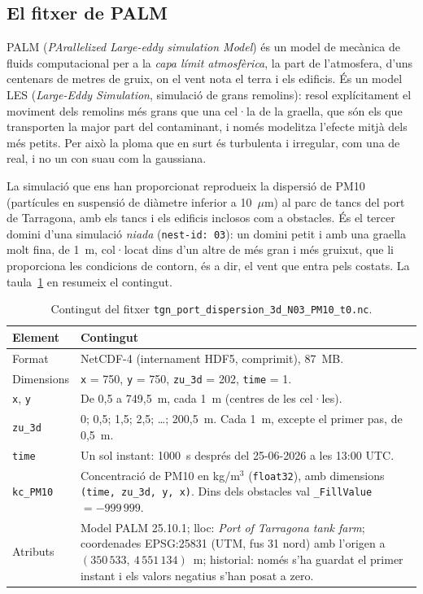 \documentclass[11pt,a4paper]{article}
\begin{document}
\subsection{El fitxer de PALM}

PALM (\emph{PArallelized Large-eddy simulation Model}) és un model de mecànica de fluids computacional per a la \emph{capa límit atmosfèrica}, la part de l'atmosfera, d'uns centenars de metres de gruix, on el vent nota el terra i els edificis. És un model LES (\emph{Large-Eddy Simulation}, simulació de grans remolins): resol explícitament el moviment dels remolins més grans que una cel·la de la graella, que són els que transporten la major part del contaminant, i només modelitza l'efecte mitjà dels més petits. Per això la ploma que en surt és turbulenta i irregular, com una de real, i no un con suau com la gaussiana.

La simulació que ens han proporcionat reprodueix la dispersió de PM10 (partícules en suspensió de diàmetre inferior a 10~$\mu$m) al parc de tancs del port de Tarragona, amb els tancs i els edificis inclosos com a obstacles. És el tercer domini d'una simulació \emph{niada} (\texttt{nest-id: 03}): un domini petit i amb una graella molt fina, de 1~m, col·locat dins d'un altre de més gran i més gruixut, que li proporciona les condicions de contorn, és a dir, el vent que entra pels costats. La taula~\ref{tab:palm} en resumeix el contingut.

\begin{table}[htbp]
\centering
\caption{Contingut del fitxer \texttt{tgn\_port\_dispersion\_3d\_N03\_PM10\_t0.nc}.}
\label{tab:palm}
\begin{tabular}{@{}lp{12.2cm}@{}}
\toprule
Element & Contingut \\
\midrule
Format & NetCDF-4 (internament HDF5, comprimit), 87~MB. \\
Dimensions & \texttt{x} = 750, \texttt{y} = 750, \texttt{zu\_3d} = 202, \texttt{time} = 1. \\
\texttt{x}, \texttt{y} & De 0,5 a 749,5~m, cada 1~m (centres de les cel·les). \\
\texttt{zu\_3d} & 0; 0,5; 1,5; 2,5; \ldots; 200,5~m. Cada 1~m, excepte el primer pas, de 0,5~m. \\
\texttt{time} & Un sol instant: 1000~s després del 25-06-2026 a les 13:00 UTC. \\
\texttt{kc\_PM10} & Concentració de PM10 en kg/m$^3$ (\texttt{float32}), amb dimensions \texttt{(time, zu\_3d, y, x)}. Dins dels obstacles val \texttt{\_FillValue} $= -999\,999$. \\
Atributs & Model PALM 25.10.1; lloc: \emph{Port of Tarragona tank farm}; coordenades EPSG:25831 (UTM, fus 31 nord) amb l'origen a $(350\,533,\ 4\,551\,134)$~m; historial: només s'ha guardat el primer instant i els valors negatius s'han posat a zero. \\
\bottomrule
\end{tabular}
\end{table}
\end{document}
